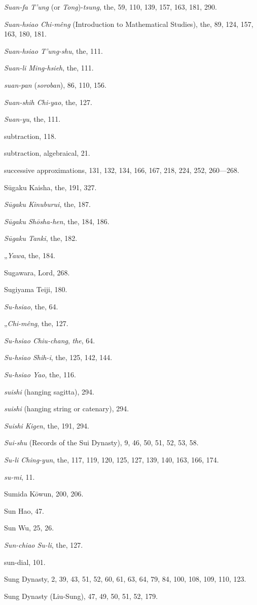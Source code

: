\documentclass[11pt]{article}
\begin{document}
\emph{Suan-fa T'ung} (or \emph{Tong})-\emph{tsung}, the, 59, 110, 139, 157, 163, 181, 290.\par
\emph{Suan-hsiao Chi-mêng} (Introduction to Mathematical Studies), the, 89, 124, 157, 163, 180, 181.\par
\emph{Suan-hsiao T'ung-shu}, the, 111.\par
\emph{Suan-li Ming-hsieh}, the, 111.\par
\emph{suan-pan} (\emph{soroban}), 86, 110, 156.\par
\emph{Suan-shih Chi-yao}, the, 127.\par
\emph{Suan-yu}, the, 111.\par
subtraction, 118.\par
subtraction, algebraical, 21.\par
successive approximations, 131, 132, 134, 166, 167, 218, 224, 252, 260---268.\par
Sūgaku Kaisha, the, 191, 327.\par
\emph{Sūgaku Kinuburui}, the, 187.\par
\emph{Sūgaku Shōsha-hen}, the, 184, 186.\par
\emph{Sūgaku Tanki}, the, 182.\par
\quad „\quad \emph{Yawa}, the, 184.\par
Sugawara, Lord, 268.\par
Sugiyama Teiji, 180.\par
\emph{Su-hsiao}, the, 64.\par
\quad „\quad \emph{Chi-mêng}, the, 127.\par
\emph{Su-hsiao Chiu-chang}, \emph{the}, 64.\par
\emph{Su-hsiao Shih-i}, the, 125, 142, 144.\par
\emph{Su-hsiao Yao}, the, 116.\par
\emph{suishi} (hanging sagitta), 294.\par
\emph{suishi} (hanging string or catenary), 294.\par
\emph{Suishi Kigen}, the, 191, 294.\par
\emph{Sui-shu} (Records of the Sui Dynasty), 9, 46, 50, 51, 52, 53, 58.\par
\emph{Su-li Ching-yun}, the, 117, 119, 120, 125, 127, 139, 140, 163, 166, 174.\par
\emph{su-mi}, 11.\par
Sumida Kōwun, 200, 206.\par
Sun Hao, 47.\par
Sun Wu, 25, 26.\par
\emph{Sun-chiao Su-li}, the, 127.\par
sun-dial, 101.\par
Sung Dynasty, 2, 39, 43, 51, 52, 60, 61, 63, 64, 79, 84, 100, 108, 109, 110, 123.\par
Sung Dynasty (Liu-Sung), 47, 49, 50, 51, 52, 179.\par
\end{document}
